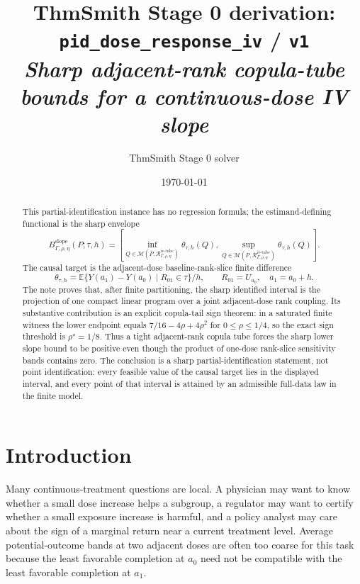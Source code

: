 \documentclass[11pt]{article}
\title{ThmSmith Stage 0 derivation: \texttt{pid\_dose\_response\_iv} / \texttt{v1}%
  \\ \large\textit{Sharp adjacent-rank copula-tube bounds for a continuous-dose IV slope}}
\author{ThmSmith Stage 0 solver}
\date{\today}
\newcommand{\E}{\mathbb{E}}
\theoremstyle{definition}
\theoremstyle{plain}
\theoremstyle{remark}
\begin{document}
\maketitle


\begin{abstract}
This partial-identification instance has no regression formula; the estimand-defining functional is the sharp envelope
\[
B_{\Gamma,\rho,\eta}^{\mathrm{slope}}(P;\tau,h)
=\left[\inf_{Q\in\mathcal M(P,\mathcal R_{\Gamma,\rho,\eta}^{\mathrm{iv\text{-}tube}})}
\theta_{\tau,h}(Q),
\sup_{Q\in\mathcal M(P,\mathcal R_{\Gamma,\rho,\eta}^{\mathrm{iv\text{-}tube}})}
\theta_{\tau,h}(Q)\right].
\]
The causal target is the adjacent-dose baseline-rank-slice finite difference
\[
\theta_{\tau,h}=\E\{Y(a_1)-Y(a_0)\mid R_{01}\in\tau\}/h,\qquad R_{01}=U_{a_0},\quad a_1=a_0+h.
\]
The note proves that, after finite partitioning, the sharp identified interval is the projection of one compact linear program over a joint adjacent-dose rank coupling.  Its substantive contribution is an explicit copula-tail sign theorem: in a saturated finite witness the lower endpoint equals \(7/16-4\rho+4\rho^2\) for \(0\le\rho\le1/4\), so the exact sign threshold is \(\rho^\star=1/8\).  Thus a tight adjacent-rank copula tube forces the sharp lower slope bound to be positive even though the product of one-dose rank-slice sensitivity bands contains zero.  The conclusion is a sharp partial-identification statement, not point identification: every feasible value of the causal target lies in the displayed interval, and every point of that interval is attained by an admissible full-data law in the finite model.
\end{abstract}

\section{Introduction}
Many continuous-treatment questions are local.  A physician may want to know whether a small dose increase helps a subgroup, a regulator may want to certify whether a small exposure increase is harmful, and a policy analyst may care about the sign of a marginal return near a current treatment level.  Average potential-outcome bands at two adjacent doses are often too coarse for this task because the least favorable completion at \(a_0\) need not be compatible with the least favorable completion at \(a_1\).
\end{document}
